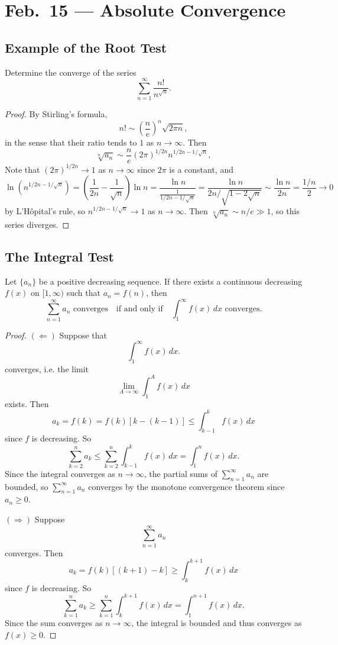 \chapter{Feb.~15 --- Absolute Convergence}

\section{Example of the Root Test}
\begin{example}
  Determine the converge of the series
  \[
    \sum_{n = 1}^\infty \frac{n!}{n^{\sqrt{n}}}.
  \]
\end{example}

\begin{proof}
  By Stirling's formula,
  \[
    n! \sim \left(\frac{n}{e}\right)^n \sqrt{2\pi n},
  \]
  in the sense that their ratio tends to $1$ as
  $n \to \infty$. Then
  \[
    \sqrt[n]{a_n} \sim \frac{n}{e} (2\pi)^{1 / 2n} n^{1 / 2n - 1 / \sqrt{n}},
  \]
  Note that $(2\pi)^{1 / 2n} \to 1$ as $n \to \infty$
  since $2\pi$ is a constant, and
  \[
    \ln(n^{1 / 2n - 1 / \sqrt{n}})
    = \left(\frac{1}{2n} - \frac{1}{\sqrt{n}}\right) \ln n
    = \frac{\ln n}{\frac{1}{1 / 2n - 1 / \sqrt{n}}}
    = \frac{\ln n}{2n / \sqrt{1 - 2\sqrt{n}}}
    \sim \frac{\ln n}{2n} = \frac{1 / n}{2} \to 0
  \]
  by L'H\^opital's rule, so $n^{1 / 2n - 1 / \sqrt{n}} \to 1$
  as $n \to \infty$. Then
  $\sqrt[n]{a_n} \sim n / e \gg 1$,
  so this series diverges.
\end{proof}

\section{The Integral Test}
\begin{theorem}
  Let $\{a_n\}$  be a positive decreasing sequence. If
  there exists a continuous decreasing $f(x)$ on
  $[1, \infty)$ such that $a_n = f(n)$, then
  \[
    \sum_{n = 1}^\infty a_n \text{ converges} \quad \text{if and only if} \quad
    \int_1^\infty f(x) \, dx \text{ converges}.
  \]
\end{theorem}

\begin{proof}
  $(\Leftarrow)$ Suppose that
  \[
    \int_1^\infty f(x) \, dx.
  \]
  converges, i.e. the limit
  \[
    \lim_{A \to \infty} \int_1^A f(x) \, dx
  \]
  exists. Then
  \[
    a_k = f(k) = f(k)[k - (k - 1)] \le \int_{k - 1}^k f(x) \, dx
  \]
  since $f$ is decreasing. So
  \[
    \sum_{k = 2}^n a_k \le \sum_{k = 2}^n \int_{k - 1}^k f(x) \, dx
    = \int_1^n f(x)\, dx.
  \]
  Since the integral converges as $n \to \infty$, the
  partial sums of $\sum_{n = 1}^\infty a_n$ are bounded,
  so $\sum_{n = 1}^\infty a_n$ converges by the
  monotone convergence theorem since $a_n \ge 0$.

  $(\Rightarrow)$ Suppose
  \[
    \sum_{n = 1}^\infty a_n
  \]
  converges. Then
  \[
    a_k = f(k)[(k + 1) - k] \ge \int_k^{k + 1} f(x) \, dx
  \]
  since $f$ is decreasing. So
  \[
    \sum_{k = 1}^n a_k \ge \sum_{k = 1}^n \int_k^{k + 1} f(x) \, dx
    = \int_1^{n + 1} f(x) \, dx.
  \]
  Since the sum converges as $n \to \infty$, the
  integral is bounded and thus converges as $f(x) \ge 0$.
\end{proof}

